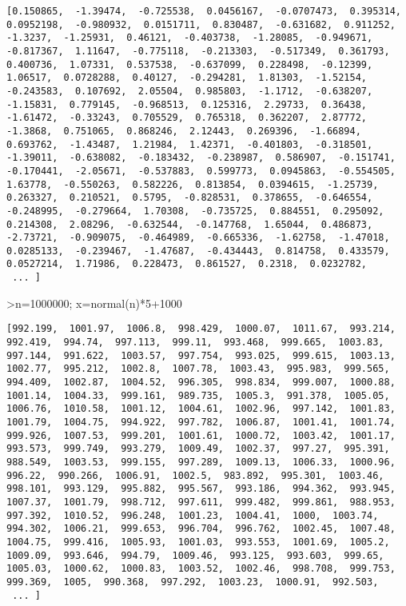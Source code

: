 \documentclass[
]{book}
\begin{document}
\begin{verbatim}
[0.150865,  -1.39474,  -0.725538,  0.0456167,  -0.0707473,  0.395314,
0.0952198,  -0.980932,  0.0151711,  0.830487,  -0.631682,  0.911252,
-1.3237,  -1.25931,  0.46121,  -0.403738,  -1.28085,  -0.949671,
-0.817367,  1.11647,  -0.775118,  -0.213303,  -0.517349,  0.361793,
0.400736,  1.07331,  0.537538,  -0.637099,  0.228498,  -0.12399,
1.06517,  0.0728288,  0.40127,  -0.294281,  1.81303,  -1.52154,
-0.243583,  0.107692,  2.05504,  0.985803,  -1.1712,  -0.638207,
-1.15831,  0.779145,  -0.968513,  0.125316,  2.29733,  0.36438,
-1.61472,  -0.33243,  0.705529,  0.765318,  0.362207,  2.87772,
-1.3868,  0.751065,  0.868246,  2.12443,  0.269396,  -1.66894,
0.693762,  -1.43487,  1.21984,  1.42371,  -0.401803,  -0.318501,
-1.39011,  -0.638082,  -0.183432,  -0.238987,  0.586907,  -0.151741,
-0.170441,  -2.05671,  -0.537883,  0.599773,  0.0945863,  -0.554505,
1.63778,  -0.550263,  0.582226,  0.813854,  0.0394615,  -1.25739,
0.263327,  0.210521,  0.5795,  -0.828531,  0.378655,  -0.646554,
-0.248995,  -0.279664,  1.70308,  -0.735725,  0.884551,  0.295092,
0.214308,  2.08296,  -0.632544,  -0.147768,  1.65044,  0.486873,
-2.73721,  -0.909075,  -0.464989,  -0.665336,  -1.62758,  -1.47018,
0.0285133,  -0.239467,  -1.47687,  -0.434443,  0.814758,  0.433579,
0.0527214,  1.71986,  0.228473,  0.861527,  0.2318,  0.0232782,
 ... ]
\end{verbatim}

\textgreater n=1000000; x=normal(n)*5+1000

\begin{verbatim}
[992.199,  1001.97,  1006.8,  998.429,  1000.07,  1011.67,  993.214,
992.419,  994.74,  997.113,  999.11,  993.468,  999.665,  1003.83,
997.144,  991.622,  1003.57,  997.754,  993.025,  999.615,  1003.13,
1002.77,  995.212,  1002.8,  1007.78,  1003.43,  995.983,  999.565,
994.409,  1002.87,  1004.52,  996.305,  998.834,  999.007,  1000.88,
1001.14,  1004.33,  999.161,  989.735,  1005.3,  991.378,  1005.05,
1006.76,  1010.58,  1001.12,  1004.61,  1002.96,  997.142,  1001.83,
1001.79,  1004.75,  994.922,  997.782,  1006.87,  1001.41,  1001.74,
999.926,  1007.53,  999.201,  1001.61,  1000.72,  1003.42,  1001.17,
993.573,  999.749,  993.279,  1009.49,  1002.37,  997.27,  995.391,
988.549,  1003.53,  999.155,  997.289,  1009.13,  1006.33,  1000.96,
996.22,  990.266,  1006.91,  1002.5,  983.892,  995.301,  1003.46,
998.101,  993.129,  995.882,  995.567,  993.186,  994.362,  993.945,
1007.37,  1001.79,  998.712,  997.611,  999.482,  999.861,  988.953,
997.392,  1010.52,  996.248,  1001.23,  1004.41,  1000,  1003.74,
994.302,  1006.21,  999.653,  996.704,  996.762,  1002.45,  1007.48,
1004.75,  999.416,  1005.93,  1001.03,  993.553,  1001.69,  1005.2,
1009.09,  993.646,  994.79,  1009.46,  993.125,  993.603,  999.65,
1005.03,  1000.62,  1000.83,  1003.52,  1002.46,  998.708,  999.753,
999.369,  1005,  990.368,  997.292,  1003.23,  1000.91,  992.503,
 ... ]
\end{verbatim}
\end{document}
